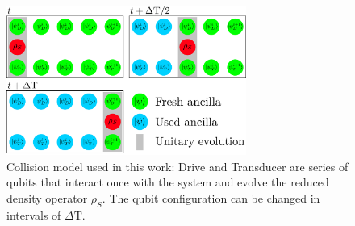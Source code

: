 \begin{figure}
	\centering
	\includegraphics[width=0.7\textwidth]{img/collision_model}
	\caption{Collision model used in this work: Drive and Transducer are series of qubits that interact once with the system and evolve the reduced density operator $\rho_S$. The qubit configuration can be changed in intervals of $\Delta \mathrm{T}$.}
	\label{collmodel}
\end{figure}